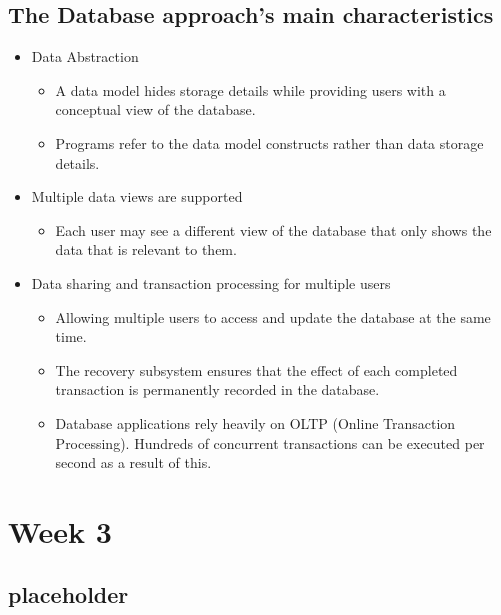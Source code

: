 \documentclass[a4paper, 12pt]{article}
\begin{document}
    \subsection{The Database approach's main characteristics}
    \begin{itemize}
        \item Data Abstraction
            \begin{itemize}
                \item A data model hides storage details while providing users with a conceptual view of the database.
                \item Programs refer to the data model constructs rather than data storage details.
            \end{itemize}
        \item Multiple data views are supported
            \begin{itemize}
                \item Each user may see a different view of the database that only shows the data that is relevant to them.
            \end{itemize}
        \item Data sharing and transaction processing for multiple users
            \begin{itemize}
                \item Allowing multiple users to access and update the database at the same time.
                \item The recovery subsystem ensures that the effect of each completed transaction is permanently recorded in the database.
                \item Database applications rely heavily on OLTP (Online Transaction Processing). 
                Hundreds of concurrent transactions can be executed per second as a result of this.                
            \end{itemize}
    \end{itemize}

\newpage
\section{Week 3}
    \subsection{placeholder}
\end{document}
